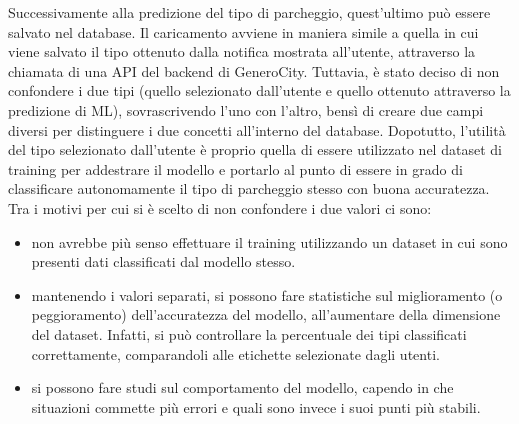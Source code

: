 Successivamente alla predizione del tipo di parcheggio, quest'ultimo può essere salvato
nel database. Il caricamento avviene in maniera simile a quella in cui viene salvato il 
tipo ottenuto dalla notifica mostrata all'utente, attraverso la chiamata di una API del 
backend di GeneroCity. Tuttavia, è stato deciso di non confondere i due tipi (quello
selezionato dall'utente e quello ottenuto attraverso la predizione di ML), sovrascrivendo
l'uno con l'altro, bensì di creare due campi diversi per distinguere i due concetti
all'interno del database. Dopotutto, l'utilità del tipo selezionato dall'utente è proprio
quella di essere utilizzato nel dataset di training per addestrare il modello e portarlo 
al punto di essere in grado di classificare autonomamente il tipo di parcheggio stesso
con buona accuratezza.
Tra i motivi per cui si è scelto di non confondere i due valori ci sono:
\begin{itemize}
    \item non avrebbe più senso effettuare il training utilizzando un dataset in cui sono
    presenti dati classificati dal modello stesso.
    \item mantenendo i valori separati, si possono fare statistiche sul miglioramento
    (o peggioramento) dell'accuratezza del modello, all'aumentare della dimensione del
    dataset. Infatti, si può controllare la percentuale dei tipi classificati correttamente,
    comparandoli alle etichette selezionate dagli utenti.
    \item si possono fare studi sul comportamento del modello, capendo in che situazioni
    commette più errori e quali sono invece i suoi punti più stabili.
\end{itemize}











